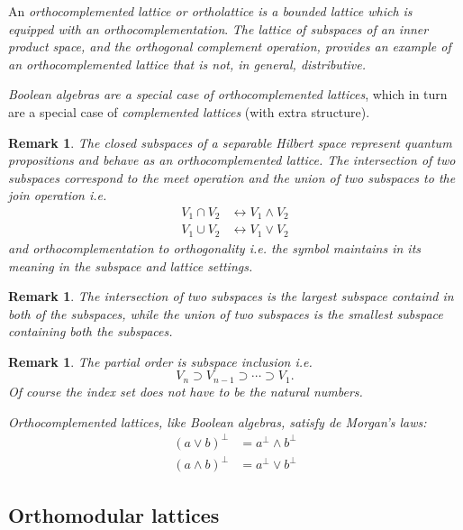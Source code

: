 \documentclass[aps,preprint]{revtex4}%
\newtheorem{remark}[theorem]{Remark}
\begin{document}
An \emph{orthocomplemented lattice or ortholattice is a bounded lattice which
is equipped with an orthocomplementation}. \emph{The lattice of subspaces of
an inner product space, and the orthogonal complement operation, provides an
example of an orthocomplemented lattice that is not, in general,
distributive.}

\emph{Boolean algebras are a special case of orthocomplemented lattices},
which in turn are a special case of \emph{complemented lattices} (with extra structure).

\begin{remark}
The closed subspaces of a separable Hilbert space represent quantum
propositions and behave as an orthocomplemented lattice. The
\emph{intersection} of two subspaces correspond to the \emph{meet} operation
and the \emph{union} of two subspaces to the \emph{join} operation i.e.
\begin{align}
V_{1}\cap V_{2}  &  \leftrightarrow V_{1}\wedge V_{2}\\
V_{1}\cup V_{2}  &  \leftrightarrow V_{1}\vee V_{2}%
\end{align}
and \emph{orthocomplementation} to \emph{orthogonality i.e.} the symbol
maintains in its meaning in the subspace and lattice settings.
\end{remark}

\begin{remark}
The \emph{intersection} of two subspaces is the largest subspace containd in
both of the subspaces, while the union of two subspaces is the smallest
subspace containing both the subspaces.
\end{remark}

\begin{remark}
The partial order is subspace inclusion i.e.
\begin{equation}
V_{n}\supset V_{n-1}\supset\cdots\supset V_{1}.
\end{equation}
Of course the index set does not have to be the natural numbers.
\end{remark}

\emph{Orthocomplemented lattices, like Boolean algebras, satisfy de Morgan's
laws:}%
\begin{align}
(a\vee b)^{\perp}  &  =a^{\bot}\wedge b^{\bot}\\
(a\wedge b)^{\perp}  &  =a^{\bot}\vee b^{\bot}%
\end{align}


\subsection{Orthomodular lattices}
\end{document}
